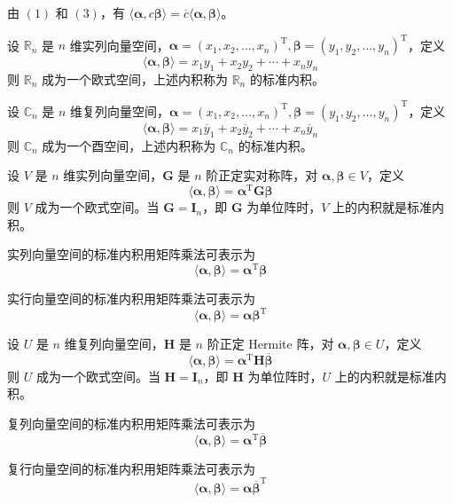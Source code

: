 \begin{remark}
    由 $(1)$ 和 $(3)$，有 $\langle \bm{\alpha}, c\bm{\beta} \rangle = \overline{c}\langle \bm{\alpha}, \bm{\beta} \rangle$。
\end{remark}

\begin{definition}
    设 $\mathbb{R}_n$ 是 $n$ 维实列向量空间，$\bm{\alpha} = (x_1, x_2, \ldots, x_n)^{\mathrm{T}}, \bm{\beta} = (y_1, y_2, \ldots, y_n)^{\mathrm{T}}$，定义
    \[
        \langle \bm{\alpha}, \bm{\beta} \rangle = x_{1}y_{1} + x_{2}y_{2} + \cdots + x_{n}y_{n}
    \]
    则 $\mathbb{R}_n$ 成为一个欧式空间，上述内积称为 $\mathbb{R}_n$ 的标准内积。
\end{definition}

\begin{definition}
    设 $\mathbb{C}_n$ 是 $n$ 维复列向量空间，$\bm{\alpha} = (x_1, x_2, \ldots, x_n)^{\mathrm{T}}, \bm{\beta} = (y_1, y_2, \ldots, y_n)^{\mathrm{T}}$，定义
    \[
        \langle \bm{\alpha}, \bm{\beta} \rangle = x_{1}\overline{y}_{1} + x_{2}\overline{y}_{2} + \cdots + x_{n}\overline{y}_{n}
    \]
    则 $\mathbb{C}_n$ 成为一个酉空间，上述内积称为 $\mathbb{C}_n$ 的标准内积。
\end{definition}

\begin{proposition}
    设 $V$ 是 $n$ 维实列向量空间，$\bm{G}$ 是 $n$ 阶正定实对称阵，对 $\bm{\alpha}, \bm{\beta} \in V$，定义
    \[
        \langle \bm{\alpha}, \bm{\beta} \rangle = \bm{\alpha}^{\mathrm{T}}\bm{G\beta}
    \]
    则 $V$ 成为一个欧式空间。当 $\bm{G} = \bm{I}_n$，即 $\bm{G}$ 为单位阵时，$V$ 上的内积就是标准内积。

    实列向量空间的标准内积用矩阵乘法可表示为
    \[
        \langle \bm{\alpha}, \bm{\beta} \rangle = \bm{\alpha}^{\mathrm{T}}\bm{\beta}
    \]

    实行向量空间的标准内积用矩阵乘法可表示为
    \[
        \langle \bm{\alpha}, \bm{\beta} \rangle = \bm{\alpha}\bm{\beta}^{\mathrm{T}}
    \]
\end{proposition}

\begin{proposition}
    设 $U$ 是 $n$ 维复列向量空间，$\bm{H}$ 是 $n$ 阶正定 Hermite 阵，对 $\bm{\alpha}, \bm{\beta} \in U$，定义
    \[
        \langle \bm{\alpha}, \bm{\beta} \rangle = \bm{\alpha}^{\mathrm{T}}\bm{H}\overline{\bm{\beta}}
    \]
    则 $U$ 成为一个欧式空间。当 $\bm{H} = \bm{I}_n$，即 $\bm{H}$ 为单位阵时，$U$ 上的内积就是标准内积。

    复列向量空间的标准内积用矩阵乘法可表示为
    \[
        \langle \bm{\alpha}, \bm{\beta} \rangle = \bm{\alpha}^{\mathrm{T}}\overline{\bm{\beta}}
    \]

    复行向量空间的标准内积用矩阵乘法可表示为
    \[
        \langle \bm{\alpha}, \bm{\beta} \rangle = \bm{\alpha}\overline{\bm{\beta}}^{\mathrm{T}}
    \]
\end{proposition}

